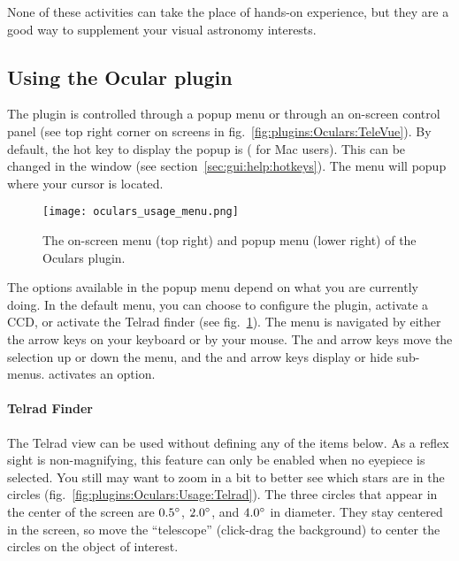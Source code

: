 \noindent None of these activities can take the place of hands-on experience, but they are a good way to supplement your visual astronomy interests.

\subsection{Using the Ocular plugin}
\label{sec:sec:plugins:Oculars:UsingPlugin}

The plugin is controlled through a popup menu or through an on-screen control panel (see top right corner on screens in fig.~\ref{fig:plugins:Oculars:TeleVue}). 
By default, the hot key to display the popup is  ( for Mac users). 
This can be changed in the  window (see section~\ref{sec:gui:help:hotkeys}). The menu will popup where your cursor is located.

\begin{figure}[t]\centering
\texttt{[image: oculars\_usage\_menu.png]}
\caption{The on-screen menu (top right) and popup menu (lower right) of the Oculars plugin.}
\label{fig:plugins:Oculars:Usage:Menu}
\end{figure}

The options available in the popup menu depend on what you are currently doing. 
In the default menu, you can choose to configure the plugin, activate a CCD, or activate the Telrad finder (see fig.~\ref{fig:plugins:Oculars:Usage:Menu}).
The menu is navigated by either the arrow keys on your keyboard or by your mouse. 
The \keys{\arrowkeyup} and \keys{\arrowkeydown} arrow keys move the selection up or down the menu, 
and the \keys{\arrowkeyleft} and \keys{\arrowkeyright}  arrow keys display or hide sub-menus. \keys{\return} activates an option.

\paragraph{Telrad Finder}

The Telrad view can be used without defining any of the items below. 
As a reflex sight is non-magnifying, this feature can only be enabled when no eyepiece is selected. 
You still may want to zoom in a bit to better see which stars are in the circles (fig.~\ref{fig:plugins:Oculars:Usage:Telrad}).
The three circles that appear in the center of the screen are $0.5\degree$, $2.0\degree$, and $4.0\degree$ in diameter. 
They stay centered in the screen, so move the ``telescope'' (click-drag the background) to center the circles on the object of interest. 

